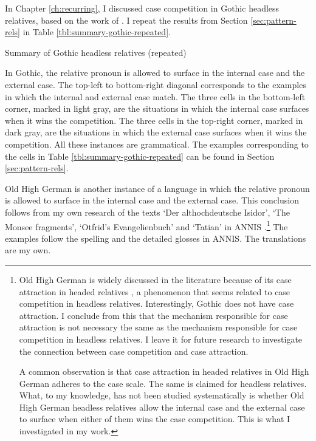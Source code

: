 In Chapter \ref{ch:recurring}, I discussed case competition in Gothic headless relatives, based on the work of \citet{harbert1978}. I repeat the results from Section \ref{sec:pattern-rels} in Table \ref{tbl:summary-gothic-repeated}.

\begin{table}[H]
  \center
  \caption{Summary of Gothic headless relatives (repeated)}
    
    \label{tbl:summary-gothic-repeated}
\end{table}

In Gothic, the relative pronoun is allowed to surface in the internal case and the external case. The top-left to bottom-right diagonal corresponds to the examples in which the internal and external case match. The three cells in the bottom-left corner, marked in light gray, are the situations in which the internal case surfaces when it wins the competition. The three cells in the top-right corner, marked in dark gray, are the situations in which the external case surfaces when it wins the competition.
 All these instances are grammatical. The examples corresponding to the cells in Table \ref{tbl:summary-gothic-repeated} can be found in Section \ref{sec:pattern-rels}.

Old High German is another instance of a language in which the relative pronoun is allowed to surface in the internal case and the external case. This conclusion follows from my own research of the texts `Der althochdeutsche Isidor', `The Monsee fragments', `Otfrid's Evangelienbuch' and `Tatian' in ANNIS \citep{krause2016}.\footnote{
Old High German is widely discussed in the literature because of its case attraction in headed relatives \citep[cf.][]{pittner1995}, a phenomenon that seems related to case competition in headless relatives. Interestingly, Gothic does not have case attraction. I conclude from this that the mechanism responsible for case attraction is not necessary the same as the mechanism responsible for case competition in headless relatives. I leave it for future research to investigate the connection between case competition and case attraction.

A common observation is that case attraction in headed relatives in Old High German adheres to the case scale.
The same is claimed for headless relatives.
What, to my knowledge, has not been studied systematically is whether Old High German headless relatives allow the internal case and the external case to surface when either of them wins the case competition. This is what I investigated in my work.
}
The examples follow the spelling and the detailed glosses in ANNIS. The translations are my own.

